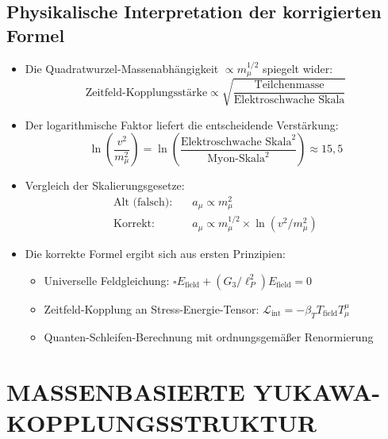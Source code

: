 \documentclass[12pt,a4paper]{article}
\begin{document}
\subsection{Physikalische Interpretation der korrigierten Formel}
\begin{itemize}
	\item Die Quadratwurzel-Massenabhängigkeit $\propto m_\mu^{1/2}$ spiegelt wider:
	\begin{equation}
		\text{Zeitfeld-Kopplungsstärke} \propto \sqrt{\frac{\text{Teilchenmasse}}{\text{Elektroschwache Skala}}}
	\end{equation}
	
	\item Der logarithmische Faktor liefert die entscheidende Verstärkung:
	\begin{equation}
		\ln\left(\frac{v^2}{m_\mu^2}\right) = \ln\left(\frac{\text{Elektroschwache Skala}^2}{\text{Myon-Skala}^2}\right) \approx 15,5
	\end{equation}
	
	\item Vergleich der Skalierungsgesetze:
	\begin{align}
		\text{Alt (falsch):} &\quad a_\mu \propto m_\mu^2 \\
		\text{Korrekt:} &\quad a_\mu \propto m_\mu^{1/2} \times \ln(v^2/m_\mu^2)
	\end{align}
	
	\item Die korrekte Formel ergibt sich aus ersten Prinzipien:
	\begin{itemize}
		\item Universelle Feldgleichung: $\square E_{\text{field}} + (G_3/\ell_P^2) E_{\text{field}} = 0$
		\item Zeitfeld-Kopplung an Stress-Energie-Tensor: $\mathcal{L}_{\text{int}} = -\beta_T T_{\text{field}} T^\mu_\mu$
		\item Quanten-Schleifen-Berechnung mit ordnungsgemäßer Renormierung
	\end{itemize}
\end{itemize}

\section{MASSENBASIERTE YUKAWA-KOPPLUNGSSTRUKTUR}
\end{document}
